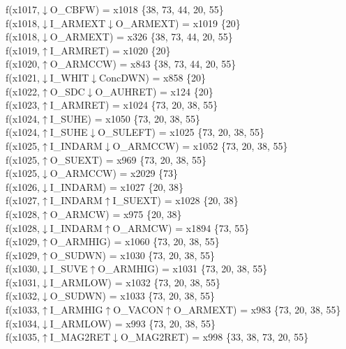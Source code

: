 f(x1017,$\downarrow$O\_CBFW) = x1018 \{38, 73, 44, 20, 55\} \\  
f(x1018,$\downarrow$I\_ARMEXT$\downarrow$O\_ARMEXT) = x1019 \{20\} \\  
f(x1018,$\downarrow$O\_ARMEXT) = x326 \{38, 73, 44, 20, 55\} \\  
f(x1019,$\uparrow$I\_ARMRET) = x1020 \{20\} \\  
f(x1020,$\uparrow$O\_ARMCCW) = x843 \{38, 73, 44, 20, 55\} \\  
f(x1021,$\downarrow$I\_WHIT$\downarrow$ConcDWN) = x858 \{20\} \\  
f(x1022,$\uparrow$O\_SDC$\downarrow$O\_AUHRET) = x124 \{20\} \\  
f(x1023,$\uparrow$I\_ARMRET) = x1024 \{73, 20, 38, 55\} \\  
f(x1024,$\uparrow$I\_SUHE) = x1050 \{73, 20, 38, 55\} \\  
f(x1024,$\uparrow$I\_SUHE$\downarrow$O\_SULEFT) = x1025 \{73, 20, 38, 55\} \\  
f(x1025,$\uparrow$I\_INDARM$\downarrow$O\_ARMCCW) = x1052 \{73, 20, 38, 55\} \\  
f(x1025,$\uparrow$O\_SUEXT) = x969 \{73, 20, 38, 55\} \\  
f(x1025,$\downarrow$O\_ARMCCW) = x2029 \{73\} \\  
f(x1026,$\downarrow$I\_INDARM) = x1027 \{20, 38\} \\  
f(x1027,$\uparrow$I\_INDARM$\uparrow$I\_SUEXT) = x1028 \{20, 38\} \\  
f(x1028,$\uparrow$O\_ARMCW) = x975 \{20, 38\} \\  
f(x1028,$\downarrow$I\_INDARM$\uparrow$O\_ARMCW) = x1894 \{73, 55\} \\  
f(x1029,$\uparrow$O\_ARMHIG) = x1060 \{73, 20, 38, 55\} \\  
f(x1029,$\uparrow$O\_SUDWN) = x1030 \{73, 20, 38, 55\} \\  
f(x1030,$\downarrow$I\_SUVE$\uparrow$O\_ARMHIG) = x1031 \{73, 20, 38, 55\} \\  
f(x1031,$\downarrow$I\_ARMLOW) = x1032 \{73, 20, 38, 55\} \\  
f(x1032,$\downarrow$O\_SUDWN) = x1033 \{73, 20, 38, 55\} \\  
f(x1033,$\uparrow$I\_ARMHIG$\uparrow$O\_VACON$\uparrow$O\_ARMEXT) = x983 \{73, 20, 38, 55\} \\  
f(x1034,$\downarrow$I\_ARMLOW) = x993 \{73, 20, 38, 55\} \\  
f(x1035,$\uparrow$I\_MAG2RET$\downarrow$O\_MAG2RET) = x998 \{33, 38, 73, 20, 55\} \\  
